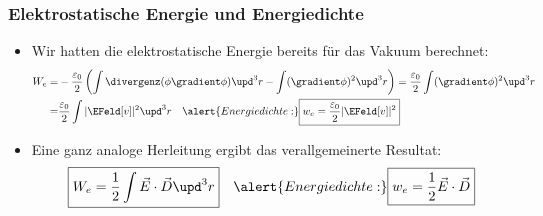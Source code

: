 \begin{frame}
\frametitle{Elektrostatische Energie und Energiedichte}
\begin{itemize}[<+->]
\item Wir hatten die elektrostatische Energie bereits für das \alert{Vakuum} berechnet:
       \begin{align*}
      W_e = & -\frac{\varepsilon_0}{2}\left(\int \divergenz(\phi\gradient\phi)
      \upd^3 r - \int (\gradient\phi)^2 \upd^3 r\right)  =
                     \frac{\varepsilon_0}{2} \int (\gradient\phi)^2 \upd^3 r\\
        = & \frac{\varepsilon_0}{2} \int |\EFeld[v]|^2 \upd^3 r
            \quad\alert{Energiedichte:} \boxed{w_e = \frac{\varepsilon_0}{2} |\EFeld[v]|^2}
      \end{align*}
 \item Eine ganz analoge Herleitung ergibt das \alert{verallgemeinerte Resultat}:
     $$
      \boxed{W_e = \frac{1}{2}\int \vec{E}\cdot\vec{D} \upd^3 r}
            \quad\alert{Energiedichte:} \boxed{w_e = \frac{1}{2} \vec{E}\cdot\vec{D}}
      $$
 \end{itemize}
\end{frame}
  

   
